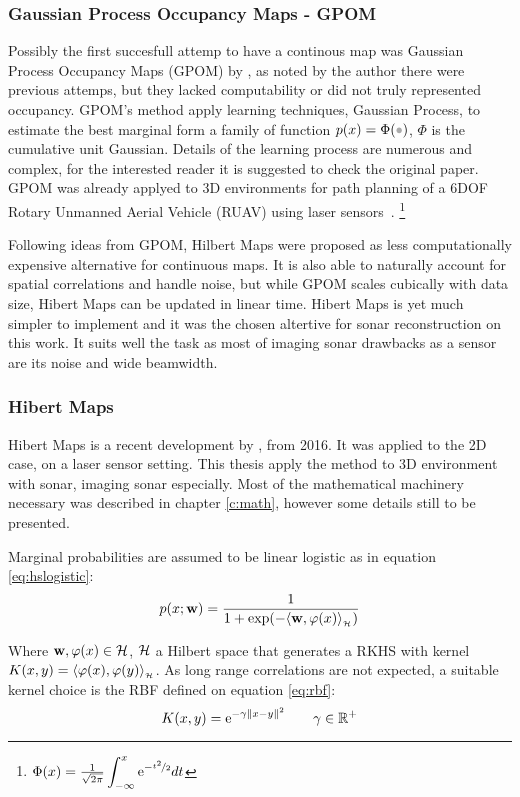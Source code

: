 \subsubsection{Gaussian
Process Occupancy Maps - GPOM}

Possibly the first succesfull attemp to have a continous map was Gaussian
Process Occupancy Maps (GPOM) by \citet{o2012gaussian}, as noted by the author
there were previous attemps, but they lacked computability or did not truly
represented occupancy. GPOM's method apply learning techniques, Gaussian
Process, to estimate the best marginal form a family of function
$p(x)=\Phi(\parm)$, $\Phi$ is the cumulative unit Gaussian. Details of the
learning process are numerous and complex, for the interested reader it is
suggested to check the original paper. GPOM was already applyed to 3D
environments for path planning of a 6DOF Rotary Unmanned Aerial Vehicle (RUAV)
using laser sensors~\cite{gan20093d}. 
\footnote{$\Phi(x)=\frac{1}{\sqrt{2\pi}}\displaystyle\int_{-\infty}^x \mathrm{e}^{-\nicefrac{t^2}{2}}dt$}

Following ideas from GPOM, Hilbert Maps were proposed as less computationally
expensive alternative for continuous maps. It is also able to naturally account
for spatial correlations and handle noise, but while GPOM scales cubically with
data size, Hibert Maps can be updated in linear time. Hibert Maps is yet much
simpler to implement and it was the chosen altertive for sonar reconstruction on
this work. It suits well the task as most of imaging sonar drawbacks as a sensor
are its noise and wide beamwidth.

\subsubsection{Hibert Maps}

Hibert Maps is a recent development by \citet{ramos2016hilbert}, from 2016. It
was applied to the 2D case, on a laser sensor setting. This thesis apply the
method to 3D environment with sonar, imaging sonar especially. Most of the
mathematical machinery necessary was described in chapter \ref{c:math}, however
some details still to be presented.

Marginal probabilities are assumed to be linear logistic as in equation
\ref{eq:hslogistic}:
\begin{equation*}
p(x;\mathrm{\mathbf{w}}) = \frac{1}{1+\exp(-\langle \mathrm{\mathbf{w}},\varphi(x)\rangle_{_{\mathcal{H}}})}
\end{equation*}

Where $\mathrm{\mathbf{w}}, \varphi(x)\in\mathcal{H}$, $\mathcal{H}$ a Hilbert space that generates a RKHS
with kernel $K(x,y)=\langle \varphi(x),\varphi(y)\rangle_{_{\mathcal{H}}}$. As long range correlations
are not expected, a suitable kernel choice is the RBF defined on
equation \ref{eq:rbf}:
\begin{equation*}
K(x,y) = \mathrm{e}^{-\gamma\left\lVert x-y\right\rVert^2} \qquad \gamma \in \mathbb{R}^+
\end{equation*}

